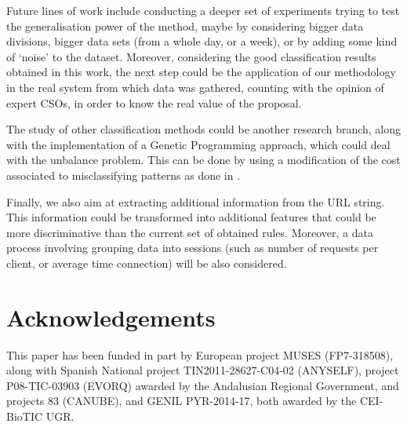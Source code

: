 \documentclass{llncs}
\begin{document}
Future lines of work include conducting a deeper set of experiments trying to test the generalisation power of the method, 
maybe by considering bigger data divisions, bigger data sets (from a whole day, or a week), or by adding some kind 
of `noise' to the dataset.
Moreover, considering the good classification results obtained in this work, the next step could be the application 
of our methodology in the real system from which data was gathered, counting with the opinion of expert CSOs, in order 
to know the real value of the proposal.

The study of other classification methods could be another research branch, along with the implementation of a Genetic 
Programming approach, which could deal with the unbalance problem. This can be done by using a modification of the 
cost associated to misclassifying patterns as done  in \cite{cost_adjustment_07}.

Finally, we also aim at extracting additional information from the URL string. This information could be transformed 
into additional features that could be more discriminative than the current set of obtained rules. Moreover, a data 
process involving grouping data into sessions (such as number of requests per client, or average time connection) 
will be also considered.


\section*{Acknowledgements}
This paper has been funded in part by European project MUSES (FP7-318508), along with Spanish National project TIN2011-28627-C04-02 (ANYSELF), project P08-TIC-03903 (EVORQ) awarded by the Andalusian Regional Government, and projects 83 (CANUBE), and GENIL PYR-2014-17, both awarded by the CEI-BioTIC UGR.



\end{document}
